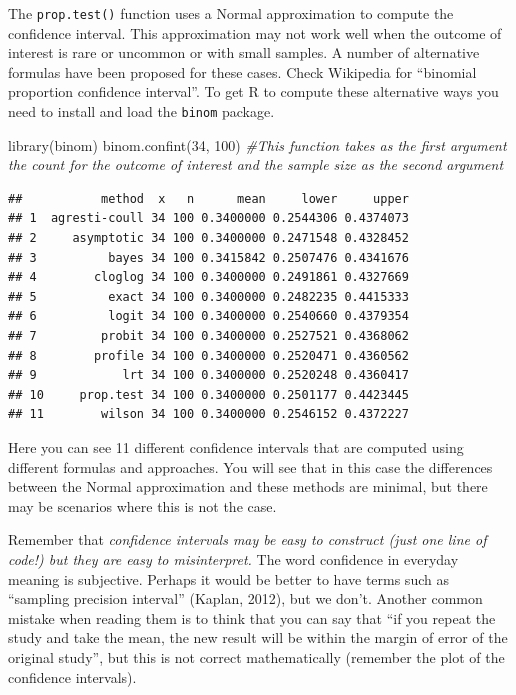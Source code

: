 \documentclass[
]{book}
\newenvironment{Shaded}{\begin{snugshade}}{\end{snugshade}}
\newcommand{\CommentTok}[1]{\textcolor[rgb]{0.56,0.35,0.01}{\textit{#1}}}
\newcommand{\DecValTok}[1]{\textcolor[rgb]{0.00,0.00,0.81}{#1}}
\newcommand{\FunctionTok}[1]{\textcolor[rgb]{0.00,0.00,0.00}{#1}}
\newcommand{\NormalTok}[1]{#1}
\begin{document}
The \texttt{prop.test()} function uses a Normal approximation to compute the confidence interval. This approximation may not work well when the outcome of interest is rare or uncommon or with small samples. A number of alternative formulas have been proposed for these cases. Check Wikipedia for ``binomial proportion confidence interval''. To get R to compute these alternative ways you need to install and load the \texttt{binom} package.

\begin{Shaded}
\begin{Highlighting}[]
\FunctionTok{library}\NormalTok{(binom)}
\FunctionTok{binom.confint}\NormalTok{(}\DecValTok{34}\NormalTok{, }\DecValTok{100}\NormalTok{) }\CommentTok{\#This function takes as the first argument the count for the outcome of interest and the sample size as the second argument}
\end{Highlighting}
\end{Shaded}

\begin{verbatim}
##           method  x   n      mean     lower     upper
## 1  agresti-coull 34 100 0.3400000 0.2544306 0.4374073
## 2     asymptotic 34 100 0.3400000 0.2471548 0.4328452
## 3          bayes 34 100 0.3415842 0.2507476 0.4341676
## 4        cloglog 34 100 0.3400000 0.2491861 0.4327669
## 5          exact 34 100 0.3400000 0.2482235 0.4415333
## 6          logit 34 100 0.3400000 0.2540660 0.4379354
## 7         probit 34 100 0.3400000 0.2527521 0.4368062
## 8        profile 34 100 0.3400000 0.2520471 0.4360562
## 9            lrt 34 100 0.3400000 0.2520248 0.4360417
## 10     prop.test 34 100 0.3400000 0.2501177 0.4423445
## 11        wilson 34 100 0.3400000 0.2546152 0.4372227
\end{verbatim}

Here you can see 11 different confidence intervals that are computed using different formulas and approaches. You will see that in this case the differences between the Normal approximation and these methods are minimal, but there may be scenarios where this is not the case.

Remember that \emph{confidence intervals may be easy to construct (just one line of code!) but they are easy to misinterpret.} The word confidence in everyday meaning is subjective. Perhaps it would be better to have terms such as ``sampling precision interval'' (Kaplan, 2012), but we don't. Another common mistake when reading them is to think that you can say that ``if you repeat the study and take the mean, the new result will be within the margin of error of the original study'', but this is not correct mathematically (remember the plot of the confidence intervals).
\end{document}
